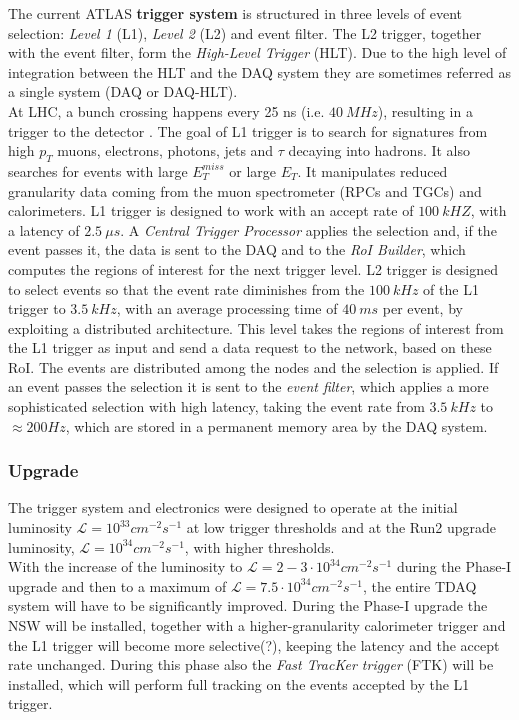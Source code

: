 \documentclass[a4paper,twoside,12pt]{article}
\begin{document}
The current ATLAS \textbf{trigger system} is structured in three levels of event selection: \textit{Level 1} (L1), \textit{Level 2} (L2) and event filter\cite{Aad:2008zzm}. The L2 trigger, together
with the event filter, form the \textit{High-Level Trigger} (HLT). Due to the high level of integration between the HLT and the DAQ system they are sometimes referred as a single system (DAQ or 
DAQ-HLT)\cite{Green:2010zza}.\\

At LHC, a bunch crossing happens every 25 ns (i.e. $40\ MHz$), resulting in a trigger to the detector . The goal of L1 trigger is to search for signatures from high $p_{T}$ muons, electrons,
photons, jets and $\tau$ decaying into hadrons. It also searches for events with large $E_{T}^{miss}$ or large $E_{T}$. It manipulates reduced granularity data coming from the muon
spectrometer (RPCs and TGCs) and calorimeters. L1 trigger is designed to work with an accept rate of $100\ kHZ$, with a latency of $2.5\ \mu s$. A \textit{Central Trigger Processor} applies
the selection and, if the event passes it, the data is
sent to the DAQ and to the \textit{RoI Builder}, which computes the regions of interest for the next trigger level.
L2 trigger is designed to select events so that the event rate diminishes from the $100\ kHz$ of the L1 trigger to $3.5\ kHz$, with an average processing time of $40\ ms$ per event, by
exploiting a distributed architecture. This
level takes the regions of interest from the L1 trigger as input and send a data request to the network, based on these RoI. The events are distributed among the nodes and the selection is applied. If an event passes the selection it is sent to the \textit{event filter}, which applies a more sophisticated selection with high latency, taking the event rate from $3.5\ kHz$ to $\approx 200 Hz$, which are stored in a permanent memory area by the DAQ system.

\subsubsection{Upgrade}
The trigger system and electronics were designed to operate at the initial luminosity 
$\mathcal{L} = 10^{33} cm^{-2}s^{-1}$ at low trigger thresholds and at the Run2 upgrade
luminosity, $\mathcal{L} = 10^{34} cm^{-2}s^{-1}$, with higher thresholds\cite{scoping}.\\

With the increase of the luminosity to $\mathcal{L} = 2-3 \cdot 10^{34} cm^{-2}s^{-1}$ during
the Phase-I upgrade and then to a maximum of $\mathcal{L} = 7.5 \cdot 10^{34} cm^{-2}s^{-1}$, the entire TDAQ system will have to be significantly improved. During the Phase-I upgrade the NSW will be installed, together with a higher-granularity calorimeter
trigger and the L1 trigger will become more selective(?), keeping the latency and the accept rate unchanged. During this phase also the \textit{Fast TracKer trigger} (FTK)\cite{FTK_TDR} will be installed, which will perform
full tracking on the events accepted by the L1 trigger. \\
\end{document}
